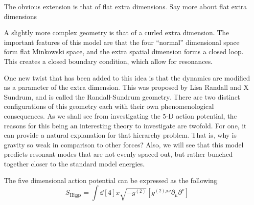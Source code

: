 \documentclass[12pt]{article}
\newcommand{\pd}{\partial}
\begin{document}
The obvious extension is that of flat extra dimensions. Say more about flat
extra dimensions

A slightly more complex geometry is that of a curled extra dimension. The
important features of this model are that the four ``normal'' dimensional space
form flat Minkowski space, and the extra spatial dimension forms a closed loop.
This creates a closed boundary condition, which allow for resonances.

One new twist that has been added to this idea is that the dynamics are modified
as a parameter of the extra dimension. This was proposed by Lisa Randall and X
Sundrum, and is called the Randall-Sundrum geometry. There are two distinct
configurations of this geometry each with their own phenomenological
consequences. As we shall see from investigating the 5-D action potential, the
reasons for this being an interesting theory to investigate are twofold. For
one, it can provide a natural explanation for that hierarchy problem. That is,
why is gravity so weak in comparison to other forces? Also, we will see that
this model predicts resonant modes that are not evenly spaced out, but rather
bunched together closer to the standard model energies.

The five dimensional action potential can be expressed as the following
\begin{equation}
    S_{\text{Higgs}} = \int
    \dd[4]{x}\sqrt{-g^{(2)}} \left[g^{(2)\mu\nu}\pd_\mu\pd^\nu \right]
\end{equation}
\end{document}
